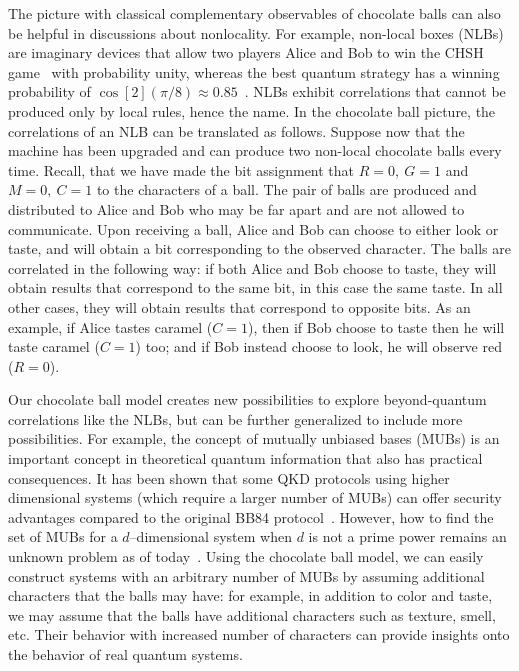 \documentclass{article}
\begin{document}
The picture with classical complementary observables of chocolate balls can also be helpful in discussions about nonlocality.
For example, non-local boxes (NLBs)~\cite{popescu1994quantum} are imaginary devices that allow two players Alice and Bob to win the CHSH game~\cite{buhrman2001quantum} with probability unity, whereas the best quantum strategy has a winning probability of $\cos[2](\pi/8) \approx 0.85$~\cite{broadbent2006power}.
NLBs exhibit correlations that cannot be produced only by local rules, hence the name.
In the chocolate ball picture, the correlations of an NLB can be translated as follows.
Suppose now that the machine has been upgraded and can produce two non-local chocolate balls every time.
Recall, that we have made the bit assignment that $R = 0,\ G = 1$ and $M = 0,\ C = 1$ to the characters of a ball.
The pair of balls are produced and distributed to Alice and Bob who may be far apart and are not allowed to communicate.
Upon receiving a ball, Alice and Bob can choose to either look or taste, and will obtain a bit corresponding to the observed character.
The balls are correlated in the following way: if both Alice and Bob choose to taste, they will obtain results that correspond to the same bit, in this case the same taste.
In all other cases, they will obtain results that correspond to opposite bits.
As an example, if Alice tastes caramel ($C = 1$), then if Bob choose to taste then he will taste caramel ($C = 1$) too; and if Bob instead choose to look, he will observe red ($R = 0$).

Our chocolate ball model creates new possibilities to explore beyond-quantum correlations like the NLBs, but can be further generalized to include more possibilities. 
For example, the concept of mutually unbiased bases (MUBs) is an important concept in theoretical quantum information that also has practical consequences.
It has been shown that some QKD protocols using higher dimensional systems (which require a larger number of MUBs) can offer security advantages compared to the original BB84 protocol~\cite{cerf2002security}.
However, how to find the set of MUBs for a $d$--dimensional system when $d$ is not a prime power remains an unknown problem as of today~\cite{coles2017entropic}.
Using the chocolate ball model, we can easily construct systems with an arbitrary number of MUBs by assuming additional characters that the balls may have: for example, in addition to color and taste, we may assume that the balls have additional characters such as texture, smell, etc.
Their behavior with increased number of characters can provide insights onto the behavior of real quantum systems.







\end{document}
